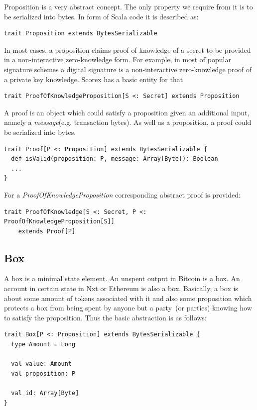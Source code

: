 \documentclass[]{report}   %
\begin{document}
Proposition is a very abstract concept. The only property we require from it is to be serialized into bytes. In form of Scala code it is described as:

\begin{lstlisting}
trait Proposition extends BytesSerializable
\end{lstlisting}

In most cases, a proposition claims proof of knowledge of a secret to be provided in a non-interactive zero-knowledge form. For example, in most of popular signature schemes a digital signature is a non-interactive zero-knowledge proof of a private key knowledge. Scorex has a basic entity for that

\begin{lstlisting}
trait ProofOfKnowledgeProposition[S <: Secret] extends Proposition
\end{lstlisting}

A proof is an object which could satisfy a proposition given an additional input, namely a \textit{message}(e.g. transaction bytes). As well as a proposition, a proof could be serialized into bytes. 

\begin{lstlisting}
trait Proof[P <: Proposition] extends BytesSerializable {
  def isValid(proposition: P, message: Array[Byte]): Boolean
  ...
}
\end{lstlisting}

For a \textit{ProofOfKnowledgeProposition} corresponding abstract proof is provided:

\begin{lstlisting}
trait ProofOfKnowledge[S <: Secret, P <: ProofOfKnowledgeProposition[S]]
	extends Proof[P]
\end{lstlisting}

\subsection{Box}

A box is a minimal state element. An unspent output in Bitcoin is a box. An account in certain state in Nxt or Ethereum is also a box. Basically, a box is about some amount of tokens associated with it and also some proposition which protects a box from being spent by anyone but a party~(or parties) knowing how to satisfy the proposition. Thus the basic abstraction is as follows:

\begin{lstlisting}
trait Box[P <: Proposition] extends BytesSerializable {
  type Amount = Long

  val value: Amount
  val proposition: P

  val id: Array[Byte]
}
\end{lstlisting}
\end{document}

